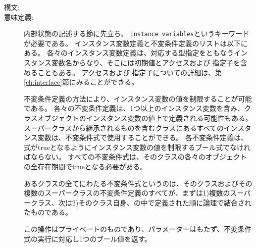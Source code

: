 \documentclass[\pformat,12pt]{jarticle}
\begin{document}
\begin{description}
\item[構文:]
  





\item[意味定義:] 内部状態の記述する節に先立ち、 {\tt instance variables}というキーワードが必要である。
インスタンス変数定義と不変条件定義のリストは以下にある。
各々のインスタンス変数定義は、対応する型指定をともなうインスタンス変数名からなり、そこには初期値とアクセスおよび  指定子を含めることもある。
アクセスおよび  指定子についての詳細は、第\ref{ch:interface}節にみることができる。

不変条件定義の方法により、インスタンス変数の値を制限することが可能である。
各々の不変条件定義は、1つ以上のインスタンス変数を含み、クラスオブジェクトのインスタンス変数の値上で定義される可能性もある。
スーパークラスから継承されるものを含むクラスにあるすべてのインスタンス変数は、不変条件式で使用することができる。
各不変条件定義は、式がtrueとなるようにインスタンス変数の値を制限するブール式でなければならない。
すべての不変条件式は、そのクラスの各々のオブジェクトの全存在期間でtrueとなる必要がある。

あるクラスの全てにわたる不変条件式というのは、そのクラスおよびその複数のスーパークラスの不変条件定義のすべてが、まずは1)複数のスーパークラス、次は2)そのクラス自身、の中で定義された順に論理で結合されたものである。

この操作はプライベートのものであり、パラメーターはもたず、不変条件式の実行に対応し1つのブール値を返す。


\end{description}
\end{document}
